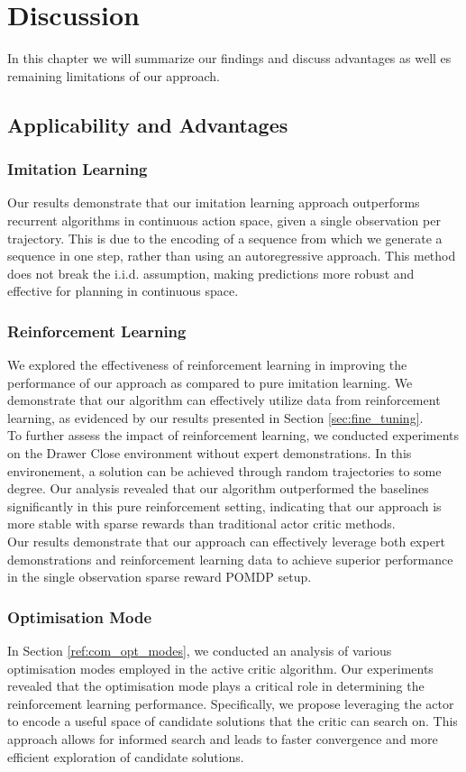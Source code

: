 
\chapter{Discussion}
\label{chapter:Discussion}
In this chapter we will summarize our findings and discuss advantages as well es remaining limitations of our approach.
\section{Applicability and Advantages}
\subsection{Imitation Learning}
Our results demonstrate that our imitation learning approach outperforms recurrent algorithms in continuous action space, 
given a single observation per trajectory. This is due to the encoding of a sequence from which we generate a sequence in one step, 
rather than using an autoregressive approach. This method does not break the i.i.d. assumption, making predictions more robust and effective 
for planning in continuous space. \\
\subsection{Reinforcement Learning}
We explored the effectiveness of reinforcement learning in improving the performance of our approach as compared to pure imitation learning. 
We demonstrate that our algorithm can effectively utilize data from reinforcement learning, as evidenced by our results presented in 
Section \ref{sec:fine_tuning}.\\
To further assess the impact of reinforcement learning, we conducted experiments on the Drawer Close environment without expert demonstrations. 
In this environement, a solution can be achieved through random trajectories to some degree. 
Our analysis revealed that our algorithm outperformed the baselines significantly in this pure reinforcement setting, 
indicating that our approach is more stable with sparse rewards than traditional actor critic methods.\\
Our results demonstrate that our approach can effectively leverage both expert demonstrations and reinforcement learning data to achieve 
superior performance in the single observation sparse reward POMDP setup.

\subsection{Optimisation Mode}
In Section \ref{ref:com_opt_modes}, we conducted an analysis of various optimisation modes employed in the active critic algorithm. 
Our experiments revealed that the optimisation mode plays a critical role in determining the reinforcement learning performance. 
Specifically, we propose leveraging the actor to encode a useful space of candidate solutions that the critic can search on. 
This approach allows for informed search and leads to faster convergence and more efficient exploration of candidate solutions.

